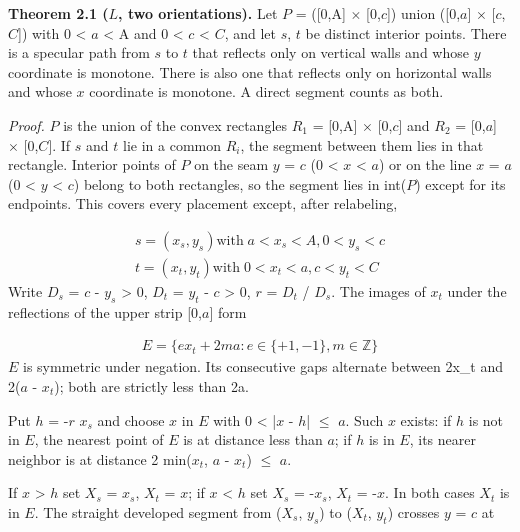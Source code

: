 \documentclass[11pt]{article}
\begin{document}
\textbf{Theorem 2.1 (\(L\), two orientations).} Let \(P\) = ([0,A] \(\times\) [0,\(c\)]) union ([0,\(a\)] \(\times\) [\(c\),\(C\)]) with 0 < \(a\) < A and 0 < \(c\) < \(C\), and let \(s\), \(t\) be distinct interior points. There is a specular path from \(s\) to \(t\) that reflects only on vertical walls and whose \(y\) coordinate is monotone. There is also one that reflects only on horizontal walls and whose \(x\) coordinate is monotone. A direct segment counts as both.

\emph{Proof.} \(P\) is the union of the convex rectangles \(R_{1}\) = [0,A] \(\times\) [0,\(c\)] and \(R_{2}\) = [0,\(a\)] \(\times\) [0,\(C\)]. If \(s\) and \(t\) lie in a common \(R_{i}\), the segment between them lies in that rectangle. Interior points of \(P\) on the seam \(y\) = \(c\) (0 < \(x\) < \(a\)) or on the line \(x\) = \(a\) (0 < \(y\) < \(c\)) belong to both rectangles, so the segment lies in int(\(P\)) except for its endpoints. This covers every placement except, after relabeling,

\begin{gather*}
s = (x_{s}, y_{s}) \text{with}\; a < x_{s} < A, 0 < y_{s} < c \\
t = (x_{t}, y_{t}) \text{with}\; 0 < x_{t} < a, c < y_{t} < C
\end{gather*}
Write \(D_{s}\) = \(c\) - \(y_{s}\) > 0, \(D_{t}\) = \(y_{t}\) - \(c\) > 0, \(r\) = \(D_{t}\) / \(D_{s}\). The images of \(x_{t}\) under the reflections of the upper strip [0,\(a\)] form

\begin{gather*}
E = \{ e x_{t} + 2ma : e \in \{+1,-1\}, m \in \mathbb{Z} \}
\end{gather*}
\(E\) is symmetric under negation. Its consecutive gaps alternate between 2x\_t and 2(\(a\) - \(x_{t}\)); both are strictly less than 2a.

Put \(h\) = -\(r\) \(x_{s}\) and choose \(x\) in \(E\) with 0 < |\(x\) - \(h\)| \(\le\) \(a\). Such \(x\) exists: if \(h\) is not in \(E\), the nearest point of \(E\) is at distance less than \(a\); if \(h\) is in \(E\), its nearer neighbor is at distance 2 min(\(x_{t}\), \(a\) - \(x_{t}\)) \(\le\) \(a\).

If \(x\) > \(h\) set \(X_{s}\) = \(x_{s}\), \(X_{t}\) = \(x\); if \(x\) < \(h\) set \(X_{s}\) = -\(x_{s}\), \(X_{t}\) = -\(x\). In both cases \(X_{t}\) is in \(E\). The straight developed segment from (\(X_{s}\), \(y_{s}\)) to (\(X_{t}\), \(y_{t}\)) crosses \(y\) = \(c\) at
\end{document}
